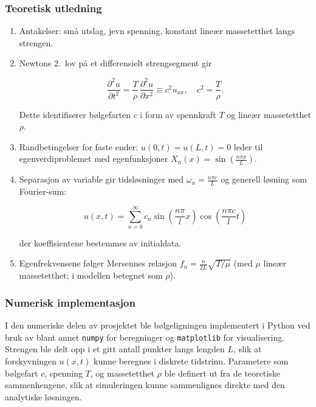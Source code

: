 \subsubsection{Teoretisk utledning}
\begin{enumerate}
  \item Antakelser: små utslag, jevn spenning, konstant lineær massetetthet langs strengen. 
  \item Newtons 2.~lov på et differensielt strengsegment gir
  
  \begin{equation*}
    \frac{\partial^2 u}{\partial t^2} = \frac{T}{\rho}\,\frac{\partial^2 u}{\partial x^2} \equiv c^2 u_{xx},\quad c^2=\frac{T}{\rho}.
  \end{equation*}

  Dette identifiserer bølgefarten $c$ i form av spennkraft $T$ og lineær massetetthet $\rho$.
  \item Randbetingelser for faste ender: $u(0,t)=u(L,t)=0$ leder til egenverdiproblemet med egenfunksjoner $X_n(x)=\sin\!\left(\frac{n\pi x}{L}\right)$. 
  \item Separasjon av variable gir tidsløsninger med $\omega_n=\frac{n\pi c}{L}$ og generell løsning som Fourier-sum:
  
  \begin{equation*}
	u(x,t) = \sum_{n=0}^{\infty} c_n 
	\sin \left( \frac{n \pi}{l} x \right)
	\cos \left( \frac{n \pi c}{l} t \right)
  \end{equation*}

  der koeffisientene bestemmes av initialdata.
  \item Egenfrekvensene følger Mersennes relasjon $f_n=\frac{n}{2L}\sqrt{T/\mu}$ (med $\mu$ lineær massetetthet; i modellen betegnet som $\rho$). 
\end{enumerate}

\subsubsection{Numerisk implementasjon}

I den numeriske delen av prosjektet ble bølgeligningen implementert i Python ved bruk av blant annet \texttt{numpy} for beregninger og \texttt{matplotlib} for visualisering. Strengen ble delt opp i et gitt antall punkter langs lengden $L$, slik at forskyvningen $u(x,t)$ kunne beregnes i diskrete tidstrinn. Parametere som bølgefart $c$, spenning $T$, og massetetthet $\rho$ ble definert ut fra de teoretiske sammenhengene, slik at simuleringen kunne sammenlignes direkte med den analytiske løsningen. 

